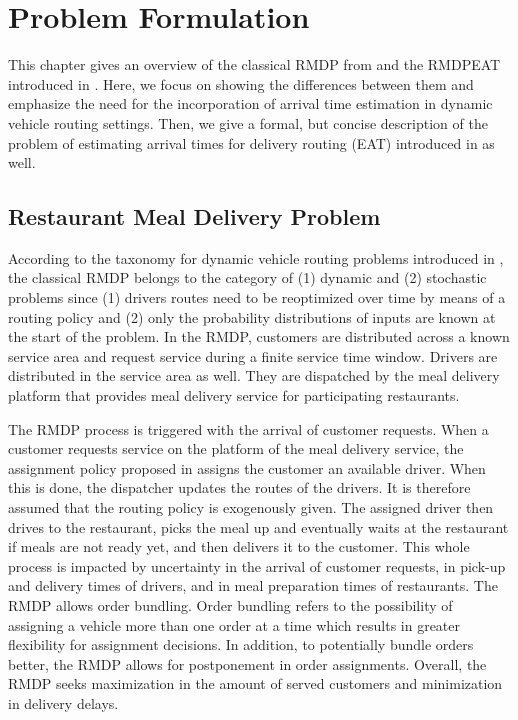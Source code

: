 \chapter{Problem Formulation}\label{chap:prob}

This chapter gives an overview of the classical RMDP from \cite{UlmerRMDP} and the RMDPEAT introduced in \cite{Hildebrandt2020_EAT}. Here, we focus on showing the differences between them and emphasize the need for the incorporation of arrival time estimation in dynamic vehicle routing settings. Then, we give a formal, but concise description of the problem of estimating arrival times for delivery routing (EAT) introduced in \cite{Hildebrandt2020_EAT} as well. 
\section{Restaurant Meal Delivery Problem}

According to the taxonomy for dynamic vehicle routing problems introduced in \cite{psaraftis}, the classical RMDP belongs to the category of (1) dynamic and (2) stochastic problems since (1) drivers routes need to be reoptimized over time by means of a routing policy and (2) only the probability distributions of inputs are known at the start of the problem. In the RMDP, customers are distributed across a known service area and request service during a finite service time window. Drivers are distributed in the service area as well. They are dispatched by the meal delivery platform that provides meal delivery service for participating restaurants. 

The RMDP process is triggered with the arrival of customer requests. When a customer requests service on the platform of the meal delivery service, the assignment policy proposed in \cite{UlmerRMDP} assigns the customer an available driver. When this is done, the dispatcher updates the routes of the drivers. It is therefore assumed that the routing policy is exogenously given. The assigned driver then drives to the restaurant, picks the meal up and eventually waits at the restaurant if meals are not ready yet, and then delivers it to the customer. This whole process is impacted by uncertainty in the arrival of customer requests, in pick-up and delivery times of drivers, and in meal preparation times of restaurants.
The RMDP allows order bundling. Order bundling refers to the possibility of assigning a vehicle more than one order at a time which results in greater flexibility for assignment decisions. In addition, to potentially bundle orders better, the RMDP allows for postponement in order assignments.
Overall, the RMDP seeks maximization in the amount of served customers and minimization in delivery delays. 

